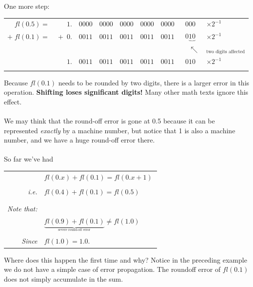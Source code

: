 \documentclass[a4paper,12pt]{report}
\begin{document}
	One more step:\\
\begin{center}
	\begin{tabular}{rrccccccl}
		$fl(0.5)=$ & $1.$ & $\!0000$ & $0000$ & $0000$ & $0000$ & $0000$ & $\!\!\!000$
			& $\times2^{-1}$\\
		$+\;fl(0.1)=$ & $\!+\;0.$ & $\!0011$ & $0011$ & $0011$ & $0011$ & $0011$
			& $0\!\!\!\underbrace{10}$ & $\times2^{-1}$\\
		&&&&&&& $\;\;\;\;\nwarrow$ &$_{\!\!\!\!\!\!\!\text{two digits affected}}$\\
		\hline
		& $1.$ & $\!0011$ & $0011$ & $0011$ & $0011$ & $0011$ & $\!\!\!010$
			& $\times2^{-1}$\\ \\

	\end{tabular}
\end{center}

	Because $fl(0.1)$ needs to be rounded by two digits, there is a larger error in this operation.
	\textbf{Shifting loses significant digits!}  Many other math texts ignore this effect.\\ \\

	We may think that the round-off error is gone at 0.5 because it can be represented \textit{exactly}
	by a machine number, but notice that 1 is also a machine number, and we have a huge round-off 
	error there.\\ \\

	So far we've had
\begin{center}
	\begin{tabular}{rl}
		& $fl(0.x)+fl(0.1)=fl(0.x+1)$\\
		& \\
		\textit{i.e.}& $fl(0.4)+fl(0.1)=fl(0.5)\qquad$\\
		& \\
		& \\
		\textit{Note that:}& \\
		& $\underbrace{fl(0.9)+fl(0.1)}_{_{\text{severe round-off error}}} \neq fl(1.0)$\\
		& \\
		\textit{Since} & $fl(1.0) = 1.0$.
\end{tabular}
\end{center}

	Where does this happen the first time and why?  Notice in the preceding example we do not have a 
	simple case of error propagation. The roundoff error of $fl(0.1)$ does not simply accumulate in the 	
	sum. \\
\end{document}
